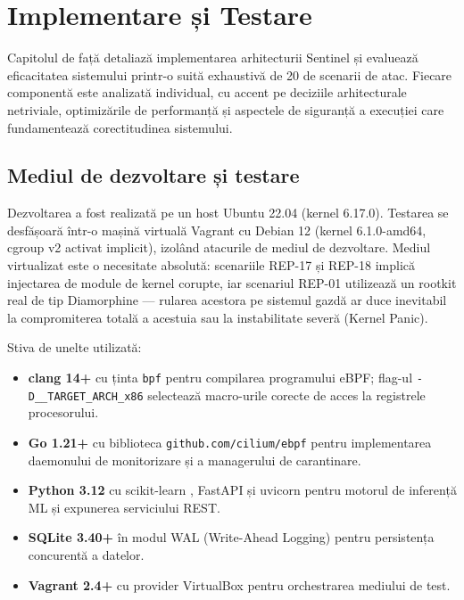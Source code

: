 \chapter{Implementare și Testare}
\label{chap:ch4}

\par Capitolul de față detaliază implementarea arhitecturii Sentinel și evaluează eficacitatea sistemului printr-o suită exhaustivă de 20 de scenarii de atac. Fiecare componentă este analizată individual, cu accent pe deciziile arhitecturale netriviale, optimizările de performanță și aspectele de siguranță a execuției care fundamentează corectitudinea sistemului.


\section{Mediul de dezvoltare și testare}
\label{sec:dev_env}

\par Dezvoltarea a fost realizată pe un host Ubuntu 22.04 (kernel 6.17.0). Testarea se desfășoară într-o mașină virtuală Vagrant cu Debian 12 (kernel 6.1.0-amd64, cgroup v2 activat implicit), izolând atacurile de mediul de dezvoltare. Mediul virtualizat este o necesitate absolută: scenariile REP-17 și REP-18 implică injectarea de module de kernel corupte, iar scenariul REP-01 utilizează un rootkit real de tip Diamorphine --- rularea acestora pe sistemul gazdă ar duce inevitabil la compromiterea totală a acestuia sau la instabilitate severă (Kernel Panic).

\par Stiva de unelte utilizată:

\begin{itemize}
    \item \textbf{clang 14+} cu ținta \texttt{bpf} pentru compilarea programului eBPF; flag-ul \texttt{-D\_\_TARGET\_ARCH\_x86} selectează macro-urile corecte de acces la registrele procesorului.
    \item \textbf{Go 1.21+} cu biblioteca \texttt{github.com/cilium/ebpf} \cite{CiliumEBPF} pentru implementarea daemonului de monitorizare și a managerului de carantinare.
    \item \textbf{Python 3.12} cu scikit-learn \cite{Pedregosa2011}, FastAPI și uvicorn pentru motorul de inferență ML și expunerea serviciului REST.
    \item \textbf{SQLite 3.40+} în modul WAL (Write-Ahead Logging) pentru persistența concurentă a datelor.
    \item \textbf{Vagrant 2.4+} cu provider VirtualBox pentru orchestrarea mediului de test.
\end{itemize}


